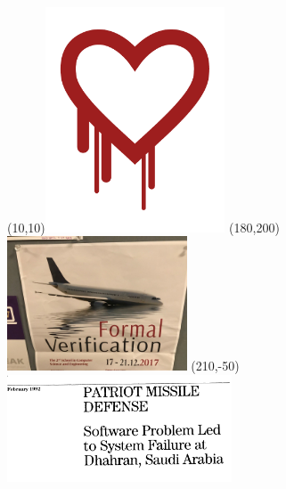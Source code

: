 \documentclass[aspectratio=169,14pt]{beamer}
\begin{document}
{ %
    \begin{frame}[plain]
         \pause

          \Put(10,10){\includegraphics[width=0.4\textwidth]{material/heartbleed.pdf}}\pause
          \Put(180,200){\includegraphics[width=0.4\textwidth]{material/formal-verification-as-a-sinking-airplane.png}}\pause
          \Put(210,-50){\includegraphics[width=0.5\textwidth]{material/us-govt-patriot-missile.png}}
     \end{frame}
}
\end{document}
